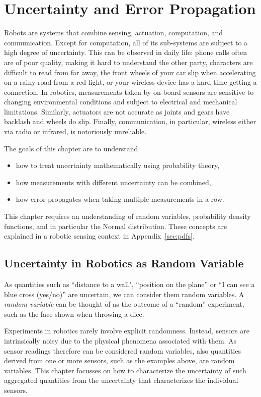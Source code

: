 \chapter{Uncertainty and Error Propagation}\label{chap:uncertainty}
Robots are systems that combine sensing, actuation, computation, and communication. Except for computation, all of its sub-systems are subject to a high degree of uncertainty. This can be observed in daily life: phone calls often are of poor quality, making it hard to understand the other party, characters are difficult to read from far away,  the front wheels of your car slip when accelerating on a rainy road from a red light, or your wireless device has a hard time getting a connection. In robotics, measurements taken by on-board sensors are sensitive to changing environmental conditions and subject to electrical and mechanical limitations. Similarly, actuators are not accurate as joints and gears have backlash and wheels do slip. Finally, communication, in particular, wireless either via radio or infrared, is notoriously unreliable.

The goals of this chapter are to understand
\begin{itemize}
\item how to treat uncertainty mathematically using probability theory,
\item how measurements with different uncertainty can be combined,
\item how error propagates when taking multiple measurements in a row.
\end{itemize}

This chapter requires an understanding of random variables, probability density functions, and in particular the Normal distribution. These concepts are explained in a robotic sensing context in Appendix~\ref{sec:pdfs}.

\section{Uncertainty in Robotics as Random Variable}
As quantities such as ``distance to a wall", ``position on the plane'' or ``I can see a blue cross (yes/no)'' are uncertain, we can consider them random variables. A \emph{random variable} can be thought of as the outcome of a ``random'' experiment, such as the face shown when throwing a dice.

Experiments in robotics rarely involve explicit randomness. Instead, sensors are intrinsically noisy due to the physical phenomena associated with them. As sensor readings therefore can be considered random variables, also quantities derived from one or more sensors, such as the examples above, are random variables. This chapter focusses on how to characterize the uncertainty of such aggregated quantities from the uncertainty that characterizes the individual sensors.

